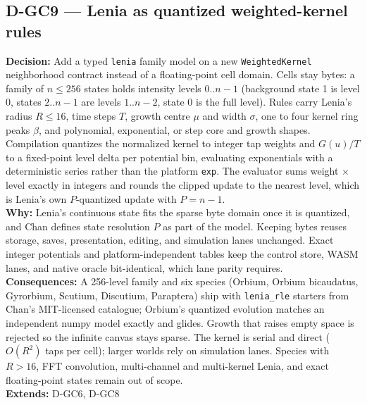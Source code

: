 \subsection*{D-GC9 --- Lenia as quantized weighted-kernel rules}
\begin{decisionbox}[title={D-GC9 \quad 2026-09-25}]
\textbf{Decision:} Add a typed \texttt{lenia} family model on a new
\texttt{WeightedKernel} neighborhood contract instead of a floating-point cell
domain. Cells stay bytes: a family of $n \le 256$ states holds intensity
levels $0..n-1$ (background state 1 is level 0, states $2..n-1$ are levels
$1..n-2$, state 0 is the full level). Rules carry Lenia's radius $R \le 16$,
time steps $T$, growth centre $\mu$ and width $\sigma$, one to four kernel
ring peaks $\beta$, and polynomial, exponential, or step core and growth
shapes. Compilation quantizes the normalized kernel to integer tap weights and
$G(u)/T$ to a fixed-point level delta per potential bin, evaluating
exponentials with a deterministic series rather than the platform
\texttt{exp}. The evaluator sums weight $\times$ level exactly in integers and
rounds the clipped update to the nearest level, which is Lenia's own
$P$-quantized update with $P = n-1$.\\
\textbf{Why:} Lenia's continuous state fits the sparse byte domain once it is
quantized, and Chan defines state resolution $P$ as part of the model. Keeping
bytes reuses storage, saves, presentation, editing, and simulation lanes
unchanged. Exact integer potentials and platform-independent tables keep the
control store, WASM lanes, and native oracle bit-identical, which lane parity
requires.\\
\textbf{Consequences:} A 256-level family and six species (Orbium, Orbium
bicaudatus, Gyrorbium, Scutium, Discutium, Paraptera) ship with
\texttt{lenia\_rle} starters from Chan's MIT-licensed catalogue; Orbium's
quantized evolution matches an independent numpy model exactly and glides.
Growth that raises empty space is rejected so the infinite canvas stays sparse.
The kernel is serial and direct ($O(R^2)$ taps per cell); larger worlds rely
on simulation lanes. Species with $R > 16$, FFT convolution, multi-channel and
multi-kernel Lenia, and exact floating-point states remain out of scope.\\
\textbf{Extends:} D-GC6, D-GC8
\end{decisionbox}

